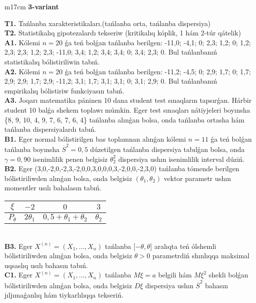 \documentclass{article}
\begin{document}
\begin{tabular}{m{17cm}}
\textbf{3-variant}
\newline

\textbf{T1.} 
Tańlanba xarakteristikaları.(tańlanba orta, tańlanba dispersiya)
 \\
\textbf{T2.} 
Statistikalıq gipotezalardı tekseriw (kritikalıq kóplik, 1 hám 2-túr qátelik)
 \\
\textbf{A1.} 
Kólemi \(n = 20\) ǵa teń bolǵan tańlanba berilgen: -11,0; -4,1; 0; 2,3; 1,2; 0; 1,2; 2,3; 2,3; 1,2; 2,3; -11,0; 3,4; 1,2; 3,4; 3,4; 0; 3,4; 2,3; 0. Bul tańlanbanıń statistikalıq bólistiriliwin tabıń.
 \\
\textbf{A2.} 
Kólemi \(n = 20\) ǵa teń bolǵan tańlanba berilgen: -11,2; -4,5; 0; 2,9; 1,7; 0; 1,7; 2,9; 2,9; 1,7; 2,9; -11,2; 3,1; 1,7; 3,1; 3,1; 0; 3,1; 2,9; 0. Bul tańlanbanıń empirikalıq bólistiriw funkciyasın tabıń.
 \\
\textbf{A3.} 
Joqarı matematika páninen 10 dana student test sınaqların tapsırǵan. Hárbir student 10 balǵa shekem toplawı múmkin. Eger test sınaqları nátiyjeleri boyınsha \{8, 9, 10, 4, 9, 7, 6, 7, 6, 4\} tańlanba alınǵan bolsa, onda tańlanba ortasha hám tańlanba dispersiyalardı tabıń.
 \\
\textbf{B1.} 
Eger normal bólistirilgen bas toplamnan alınǵan kólemi \(n = 11\) ǵa teń bolǵan tańlanba boyınsha \({\overline{S}}^{2} = 0,5\) dúzetilgen tańlanba dispersiya tabılǵan bolsa, onda \(\gamma = 0,90\) isenimlilik penen belgisiz \(\theta_{2}^{2}\) dispersiya ushın isenimlilik interval dúziń.
 \\
\textbf{B2.} 
Eger (3,0,-2,0,-2,3,-2,0,0,3,0,0,0,3,-2,0,0,-2,3,0) tańlanba tómende berilgen bólistiriliwden alınǵan bolsa, onda belgisiz \(\left( \theta_{1},\theta_{2} \right)\) vektor parametr ushın momentler usılı bahalasın tabıń.
\begin{tabular}{|c|c|c|c|}
  \hline
$\xi$ &
$- 2$ &
$0$ &
$3$\\
\hline
\(P_{\theta}\) & \({2\theta}_{1}\) & \(0,5 + \theta_{1} + \theta_{2}\) & \(\theta_{2}\) \\
\hline
\end{tabular}
 \\
\textbf{B3.} 
Eger \(X^{(n)} = \left( X_{1},...,X_{n} \right)\) tańlanba \(\lbrack - \theta,\theta\rbrack\) aralıqta teń ólshemli bólistiriliwden alınǵan bolsa, onda belgisiz \(\theta > 0\) parametrdiń shınlıqqa maksimal uqsaslıq usılı bahasın tabıń.
 \\
\textbf{C1.} 
Eger \(X^{(n)} = \left( X_{1},...,X_{n} \right)\) tańlanba \(M\xi = a\) belgili hám \(M\xi^{2}\) shekli bolǵan bólistiriliwden alınǵan bolsa, onda belgisiz \(D\xi\) dispersiya ushın \({\overline{S}}^{2}\) bahasın jıljımaǵanlıq hám tiykarlılıqqa tekseriń.

\end{tabular}
\end{document}
